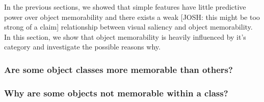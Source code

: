 In the previous sections, we showed that simple features have little predictive power over object memorability and there exists a weak [JOSH: this might be too strong of a claim] relationship between visual saliency and object memorability. In this section, we show that object memorability is heavily influenced by it's category and investigate the possible reasons why.

\subsubsection{Are some object classes more memorable than others?}



\subsubsection{Why are some objects not memorable within a class?}



